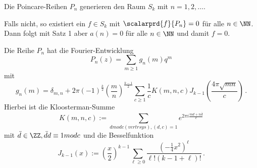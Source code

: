 \begin{koro}
Die Poincare-Reihen $P_n$ generieren den Raum $S_k$ mit $n = 1, 2, \ldots$.
\end{koro}

\begin{bewe}
Falls nicht, so existiert ein $f \in S_k$ mit $\scalarprd {f}{P_n} = 0$ für alle $n \in \NN$. Dann folgt mit Satz 1 aber $a(n) = 0$ für alle $n \in \NN$ und damit $f = 0$.
\end{bewe}

\begin{satz}
Die Reihe $P_n$ hat die Fourier-Entwicklung
\[
	P_n(z) = \sum_{m \geq 1} g_n(m) q^m
\]
mit
\[
	g_n(m) = \delta_{m,n} + 2\pi (-1)^{\frac k2} (\frac mn)^{\frac {k-1}2} \sum_{c \geq 1} \frac 1c K(m,n,c) J_{k-1}(\frac{4\pi \sqrt{mn}}c)
	\,.
\]
Hierbei ist die Kloosterman-Summe
\[
	K(m,n,c) := \sum_{d mod c (vertrsys), (d,c)=1} e^{2\pi i \frac{md + n\bar{d}}{c}}
\]
mit $\bar d \in \ZZ, \bar d d \equiv 1 mod c$ und die Besselfunktion
\[
	J_{k-1}(x) := (\frac x2)^{k-1} \sum_{\ell \geq 0} \frac{(-\frac 14 x^2)^\ell}{\ell! (k-1+\ell)!}
	\,.
\]
\end{satz}

